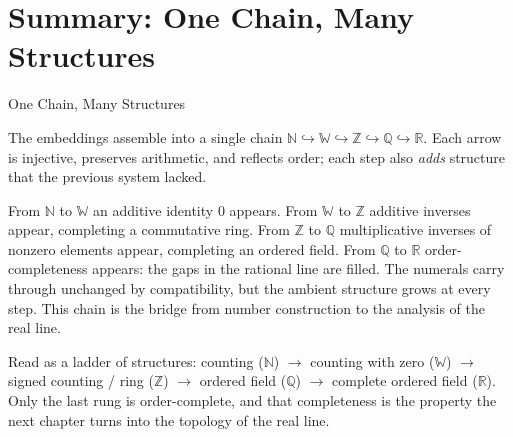 \section{Summary: One Chain, Many Structures}
\label{sec:one-chain-many-structures}

\begin{topicbox}{One Chain, Many Structures}
\begin{exposition}
The embeddings assemble into a single chain $\mathbb{N}\hookrightarrow\mathbb{W}\hookrightarrow\mathbb{Z}\hookrightarrow\mathbb{Q}\hookrightarrow\mathbb{R}$. Each arrow is injective, preserves arithmetic, and reflects order; each step also \emph{adds} structure that the previous system lacked.
\end{exposition}
\begin{exposition}
From $\mathbb{N}$ to $\mathbb{W}$ an additive identity $0$ appears. From $\mathbb{W}$ to $\mathbb{Z}$ additive inverses appear, completing a commutative ring. From $\mathbb{Z}$ to $\mathbb{Q}$ multiplicative inverses of nonzero elements appear, completing an ordered field. From $\mathbb{Q}$ to $\mathbb{R}$ order-completeness appears: the gaps in the rational line are filled. The numerals carry through unchanged by compatibility, but the ambient structure grows at every step. This chain is the bridge from number construction to the analysis of the real line.
\end{exposition}
\end{topicbox}
\begin{remark*}[Exposition]
Read as a ladder of structures: counting ($\mathbb{N}$) $\to$ counting with zero ($\mathbb{W}$) $\to$ signed counting / ring ($\mathbb{Z}$) $\to$ ordered field ($\mathbb{Q}$) $\to$ complete ordered field ($\mathbb{R}$). Only the last rung is order-complete, and that completeness is the property the next chapter turns into the topology of the real line.
\end{remark*}
